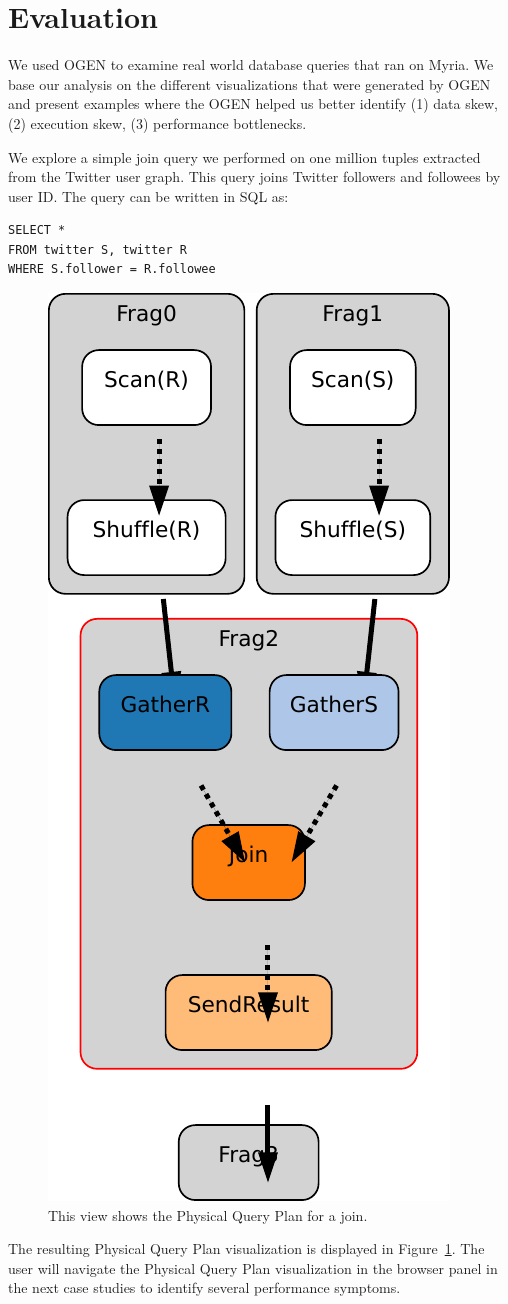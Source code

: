 \documentclass{chi2009}
\newcommand*{\system}{OGEN\xspace}
\newcommand*{\graph}{Physical Query Plan\xspace}
\begin{document}
\section{Evaluation}
\label{sec:eval}

We used \system to examine real world database queries that ran on Myria. We base our analysis on the different visualizations that were generated by \system and present examples where the \system helped us better identify (1) data skew, (2) execution skew, (3) performance bottlenecks.

We explore a simple join query we performed on one million tuples extracted from the Twitter user graph. This query joins Twitter followers and followees by user ID. The query can be written in SQL as:

\begin{lstlisting}
SELECT *
FROM twitter S, twitter R
WHERE S.follower = R.followee
\end{lstlisting}


\begin{figure}[ht]
  \centering
  \includegraphics[width=0.4\columnwidth]{images/graph_join}
  \caption{This view shows the \graph for a join.}
  \label{fig:join}
\end{figure}


The resulting \graph visualization is displayed in Figure~\ref{fig:join}. The user will navigate the \graph visualization in the browser panel in the next case studies to identify several performance symptoms.
\end{document}

